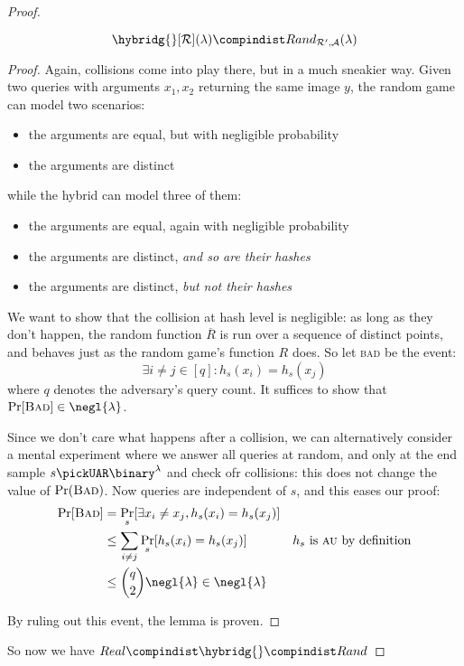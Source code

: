 \begin{proof}
    \begin{lemma}
        \[
            \hybridg{}[\R](\lambda) \compindist Rand_{\R', \A}(\lambda)
        \]
    \end{lemma}

    \begin{proof}

        Again, collisions come into play there, but in a much sneakier way. Given two queries with arguments $x_1, x_2$ returning the same image $y$, the random game can model two scenarios:

        \begin{itemize}
            \item the arguments are equal, but with negligible probability
            \item the arguments are distinct
        \end{itemize}

        while the hybrid can model three of them:

        \begin{itemize}
            \item the arguments are equal, again with negligible probability
            \item the arguments are distinct, \emph{and so are their hashes}
            \item the arguments are distinct, \emph{but not their hashes}
        \end{itemize}
    
        We want to show that the collision at hash level is negligible: as long as they don't happen, the random function $\overline{R}$ is run over a sequence of distinct points, and behaves just as the random game's function $R$ does. So let \textsc{bad} be the event:
        \[
            \exists i \neq j \in [q] : h_s(x_i) = h_s(x_j)
        \]
        where $q$ denotes the adversary's query count. It suffices to show that $\Pr[\textsc{Bad}] \in \negl{\lambda}$.

        Since we don't care what happens after a collision, we can alternatively consider a mental experiment where we answer all queries at random, and only at the end sample $s \pickUAR \binary^\lambda$ and check ofr collisions: this does not change the value of $\Pr(\textsc{Bad})$. Now queries are independent of $s$, and this eases our proof:
        \begin{align*}
            \Pr[\textsc{Bad}] &= \Pr_s [\exists x_i \neq x_j, h_s(x_i) = h_s(x_j)] &\\
            &\leq \sum_{i \neq j} \Pr_s [h_s(x_i) = h_s(x_j)] & h_s \text{ is \textsc{au} by definition} \\
            &\leq \binom{q}{2} \negl{\lambda} \in \negl{\lambda} &
        \end{align*}

        By ruling out this event, the lemma is proven.
    \end{proof}

     So now we have $Real \compindist \hybridg{} \compindist Rand$
\end{proof}

